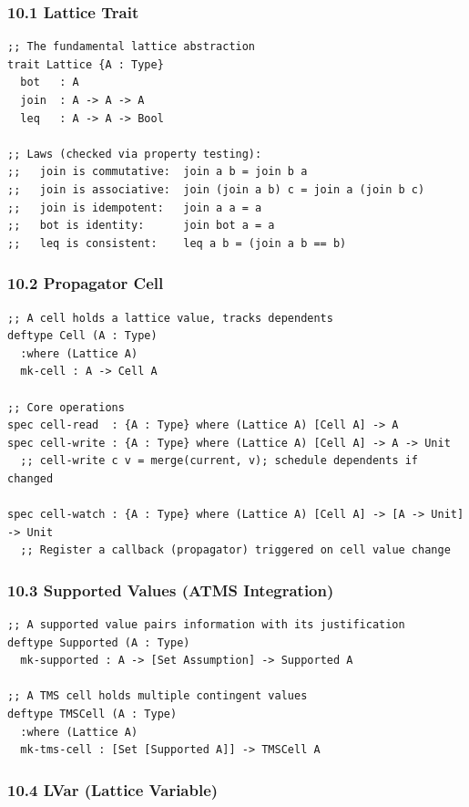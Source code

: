 \documentclass[11pt]{article}
\begin{document}
\subsubsection{10.1 Lattice Trait}
\label{sec:orgcfd006b}

\begin{verbatim}
;; The fundamental lattice abstraction
trait Lattice {A : Type}
  bot   : A
  join  : A -> A -> A
  leq   : A -> A -> Bool

;; Laws (checked via property testing):
;;   join is commutative:  join a b = join b a
;;   join is associative:  join (join a b) c = join a (join b c)
;;   join is idempotent:   join a a = a
;;   bot is identity:      join bot a = a
;;   leq is consistent:    leq a b = (join a b == b)
\end{verbatim}
\subsubsection{10.2 Propagator Cell}
\label{sec:orgb13f8b1}

\begin{verbatim}
;; A cell holds a lattice value, tracks dependents
deftype Cell (A : Type)
  :where (Lattice A)
  mk-cell : A -> Cell A

;; Core operations
spec cell-read  : {A : Type} where (Lattice A) [Cell A] -> A
spec cell-write : {A : Type} where (Lattice A) [Cell A] -> A -> Unit
  ;; cell-write c v = merge(current, v); schedule dependents if changed

spec cell-watch : {A : Type} where (Lattice A) [Cell A] -> [A -> Unit] -> Unit
  ;; Register a callback (propagator) triggered on cell value change
\end{verbatim}
\subsubsection{10.3 Supported Values (ATMS Integration)}
\label{sec:org468f5dd}

\begin{verbatim}
;; A supported value pairs information with its justification
deftype Supported (A : Type)
  mk-supported : A -> [Set Assumption] -> Supported A

;; A TMS cell holds multiple contingent values
deftype TMSCell (A : Type)
  :where (Lattice A)
  mk-tms-cell : [Set [Supported A]] -> TMSCell A
\end{verbatim}
\subsubsection{10.4 LVar (Lattice Variable)}
\label{sec:org398da1e}
\end{document}
